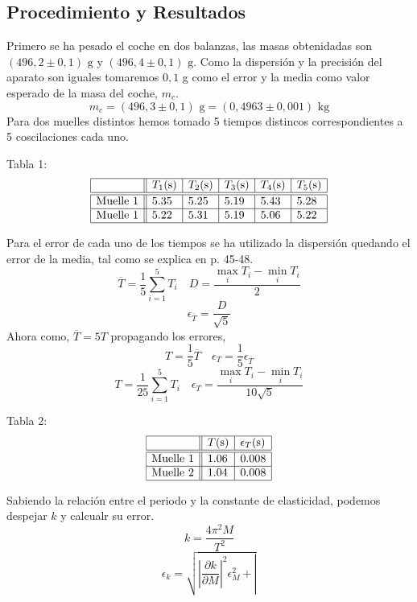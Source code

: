 \documentclass{article}
\begin{document}
\begin{multicols}{2}
\section*{Procedimiento y Resultados}
Primero se ha pesado el coche en dos balanzas, las masas obtenidadas son $(496,2\pm0,1)\text{ g}$ y $(496,4\pm0,1)\text{ g}$. Como la dispersión y la precisión del aparato son iguales tomaremos $0,1$ g como el error y la media como valor esperado de la masa del coche, $m_c$.
$$
m_c = (496,3 \pm 0,1) \text{ g} = (0,4963 \pm 0,001) \text{ kg}
$$
Para dos muelles distintos hemos tomado 5 tiempos distincos correspondientes a 5 coscilaciones cada uno.
\begin{center}
Tabla 1:
$$
\begin{array}{|l||l|l|l|l|l|} \hline
     & T_1\text{(s)} & T_2\text{(s)} & T_3\text{(s)} & T_4\text{(s)} & T_5\text{(s)} \\ \hline \hline
    \text{Muelle 1} & 5.35 & 5.25 & 5.19 & 5.43 & 5.28  \\ \hline
    \text{Muelle 1} & 5.22 & 5.31 & 5.19 & 5.06 & 5.22  \\ \hline
\end{array}
$$
\end{center}
Para el error de cada uno de los tiempos se ha utilizado la dispersión quedando el error de la media, tal como se explica en \cite{manual} p. 45-48.
$$
\overline{T} = \frac{1}{5} \sum_{i=1}^5 T_i \quad D = \frac{\max_i T_i - \min_i T_i}{2}
$$
$$
\epsilon_{\overline{T}} = \frac{D}{\sqrt{5}}
$$
Ahora como, $\overline{T}=5T$ propagando los errores,
$$
T = \frac{1}{5} \overline{T} \quad \epsilon_T = \frac{1}{5} \epsilon_{\overline{T}}
$$
$$
T = \frac{1}{25} \sum_{i=1}^5 T_i \quad \epsilon_T = \frac{\max_i T_i - \min_i T_i}{10\sqrt{5}}
$$
\begin{center}
    Tabla 2:
    $$
    \begin{array}{|l||l|l|} \hline
        & T\text{(s)} & \epsilon_T\text{(s)} \\ \hline \hline
        \text{Muelle 1} & 1.06 & 0.008  \\ \hline
        \text{Muelle 2} & 1.04 & 0.008  \\ \hline
        \end{array}
    $$
\end{center}
Sabiendo la relación entre el periodo y la constante de elasticidad, podemos despejar $k$ y calcualr su error.
$$
k = \frac{4 \pi^2 M}{T^2}
$$
$$
\epsilon_k = \sqrt{
    \left|
        \frac{\partial k}{\partial M}
    \right|^2 \epsilon_M^2
    +
    \left|
}$$
\end{multicols}
\end{document}
